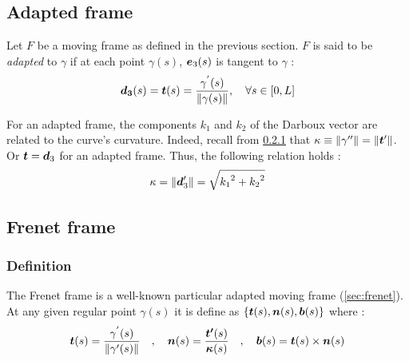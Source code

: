 \subsection{Adapted frame}
Let $F$ be a moving frame as defined in the previous section. $F$ is said to be \emph{adapted} to $\gamma$ if at each point $\gamma(s)$, $\boldsymbol{e}_{3}(s)$ is tangent to $\gamma$ :
\begin{equation}
	\boldsymbol{d_{3}}(s) = \boldsymbol{t}(s) = \frac{\gamma^{'}(s)}{\|\gamma(s)\|}, \quad \forall s \in [0,L]
\end{equation}

For an adapted frame, the components $k_1$ and $k_2$ of the Darboux vector are related to the curve's curvature. Indeed, recall from \ref{} that $\kappa \equiv \|\gamma''\| = \|\boldsymbol{t}'\|$. Or $\boldsymbol{t} = \boldsymbol{d}_3$ for an adapted frame. Thus, the following relation holds :
\begin{equation}
	\kappa = \|\boldsymbol{d}'_3\| = \sqrt{{k_{1}}^2 + {k_{2}}^2}
\end{equation}

\subsection{Frenet frame}

\subsubsection{Definition}
The Frenet frame is a well-known particular adapted moving frame (\autoref{sec:frenet}). At any given regular point $\gamma(s)$ it is define as $\{\boldsymbol{t}(s),\boldsymbol{n}(s),\boldsymbol{b}(s)\}$ where : 
\begin{gather}
\boldsymbol{t}(s) = \frac{\gamma^{'}(s)}{\|\gamma'(s)\|}
\quad,\quad
\boldsymbol{n}(s) = \frac{\boldsymbol{t'}(s)}{\boldsymbol{\kappa}(s)}
\quad,\quad
\boldsymbol{b}(s)= \boldsymbol{t}(s)\times\boldsymbol{n}(s)
\end{gather}

